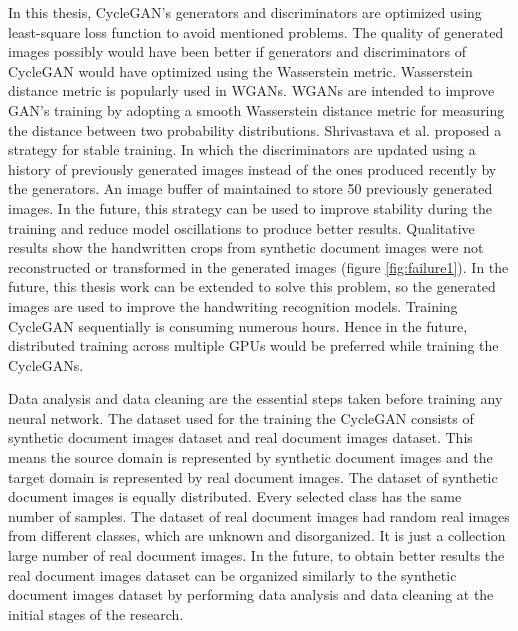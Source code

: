 In this thesis, \ac{CycleGAN}'s generators and discriminators are optimized using least-square loss function\cite{mao2017squares} to avoid mentioned problems. The quality of generated images possibly would have been better if generators and discriminators of \ac{CycleGAN} would have optimized using the Wasserstein metric. Wasserstein distance metric is popularly used in \acp{WGAN}. \acp{WGAN} are intended to improve \ac{GAN}'s training by adopting a smooth Wasserstein distance metric for measuring the distance between two probability distributions. Shrivastava et al.\cite{shrivastava2017learning} proposed a strategy for stable training. In which the discriminators are updated using a history of previously generated images instead of the ones produced recently by the generators. An image buffer of maintained to store 50 previously generated images. In the future, this strategy can be used to improve stability during the training and reduce model oscillations to produce better results. Qualitative results show the handwritten crops from synthetic document images were not reconstructed or transformed in the generated images (figure \ref{fig:failure1}). In the future, this thesis work can be extended to solve this problem, so the generated images are used to improve the handwriting recognition models. Training \ac{CycleGAN} sequentially is consuming numerous hours. Hence in the future, distributed training across multiple GPUs would be preferred while training the \acp{CycleGAN}.

Data analysis and data cleaning are the essential steps taken before training any neural network. The dataset used for the training the \ac{CycleGAN} consists of synthetic document images dataset and real document images dataset. This means the source domain is represented by synthetic document images and the target domain is represented by real document images. The dataset of synthetic document images is equally distributed. Every selected class has the same number of samples. The dataset of real document images had random real images from different classes, which are unknown and disorganized. It is just a collection large number of real document images. In the future, to obtain better results the real document images dataset can be organized similarly to the synthetic document images dataset by performing data analysis and data cleaning at the initial stages of the research.




























